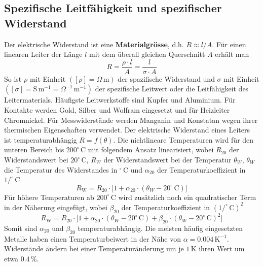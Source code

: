 \subsection{Spezifische Leitfähigkeit und spezifischer Widerstand}
Der elektrische Widerstand ist eine \textbf{Materialgrösse}, d.h. $R\approx l/A$. Für einen linearen Leiter der Länge $l$ mit dem überall gleichen Querschnitt $A$ erhält man
\begin{equation}
\boxed{R=\dfrac{\rho\cdot l}{A}=\dfrac{l}{\sigma\cdot A}}
\end{equation}
So ist $\rho$ mit Einheit $\left([\rho]=\Omega\,\text{m}\right)$ der spazifische Widerstand und $\sigma$ mit Einheit $\left([\sigma]=\text{S}\,\text{m}^{-1}=\Omega^{-1}\,\text{m}^{-1}\right)$ der spezifische Leitwert oder die Leitfähigkeit des Leitermaterials.
\newline\newline
Häufigste Leitwerkstoffe sind Kupfer und Aluminium. Für Kontakte werden Gold, Silber und Wolfram eingesetzt und für Heizleiter Chromnickel. Für Messwiderstände werden Manganin und Konstatan wegen ihrer thermischen Eigenschaften verwendet. Der elektrische Widerstand eines Leiters ist temperaturabhängig $R=f\left(\theta\right)$.
\newline\newline
Die nichtlineare Temperaturen wird für den unteren Bereich bis $200^{\circ}\,\text{C}$ mit folgendem Ansatz linearisiert, wobei $R_{20}$ der Widerstandswert bei $20^{\circ}\,\text{C}$, $R_W$ der Widerstandswert bei der Temperatur $\theta_W$, $\theta_W$ die Temperatur des Widerstandes in $^{\circ}\,\text{C}$ und $\alpha_{20}$ der Temperaturkoeffizient in $1/^{\circ}\,\text{C}$
\begin{equation}
\boxed{R_{\text{W}}=R_{20}\cdot \Big[1+\alpha_{20}\cdot \left(\theta_W-20^{\circ}\,\text{C}\right)\Big]}
\end{equation}
Für höhere Temperaturen ab $200^{\circ}\,\text{C}$ wird zusätzlich noch ein quadratischer Term in der Näherung eingefügt, wobei $\beta_{20}$ der Temperaturkoeffizient in $\left(1/^{\circ}\,\text{C}\right)^2$
\begin{equation}
\boxed{R_{\text{W}}=R_{20}\cdot \Big[1+\alpha_{20}\cdot \left(\theta_W-20^{\circ}\,\text{C}\right)+\beta_{20}\cdot \left(\theta_W-20^{\circ}\,\text{C}\right)^2\Big]}
\end{equation}
Somit sind $\alpha_{20}$ und $\beta_{20}$ temperaturabhängig. Die meisten häufig eingesetzten Metalle haben einen Temperaturbeiwert in der Nähe von $\alpha=0.004\,\text{K}^{-1}$. Widerstände ändern bei einer Temperaturänderung um je $1\,\text{K}$ ihren Wert um etwa $0.4\,\%$.
